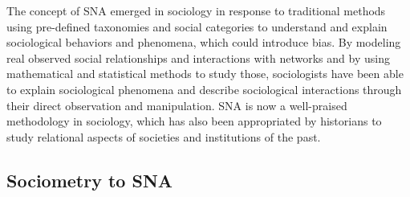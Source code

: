 The concept of SNA emerged in sociology in response to traditional methods using pre-defined taxonomies and social categories to understand and explain sociological behaviors and phenomena, which could introduce bias.
By modeling real observed social relationships and interactions with networks and by using mathematical and statistical methods to study those, sociologists have been able to explain sociological phenomena and describe sociological interactions through their direct observation and manipulation.
SNA is now a well-praised methodology in sociology, which has also been appropriated by historians to study relational aspects of societies and institutions of the past.

\subsection{Sociometry to SNA}

